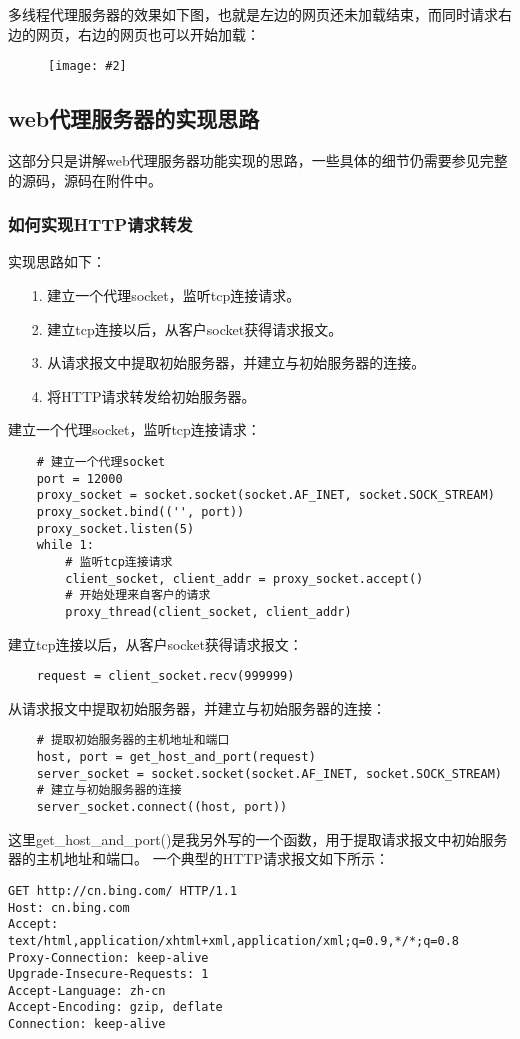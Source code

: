 \documentclass[a4paper,left=2.5cm,right=2.5cm,11pt]{article}
\newcommand{\sizedfic}[2]{\begin{figure}[H]
		\center
		\texttt{[image: \#2]}
	\end{figure}}
\begin{document}
	多线程代理服务器的效果如下图，也就是左边的网页还未加载结束，而同时请求右边的网页，右边的网页也可以开始加载：
	\sizedfic{0.7}{3.jpeg}

\subsection{web代理服务器的实现思路}
	这部分只是讲解web代理服务器功能实现的思路，一些具体的细节仍需要参见完整的源码，源码在附件中。

\subsubsection{如何实现HTTP请求转发}
	实现思路如下：
	\begin{itemize}
		\item[1.] 建立一个代理socket，监听tcp连接请求。
		\item[2.] 建立tcp连接以后，从客户socket获得请求报文。
		\item[3.] 从请求报文中提取初始服务器，并建立与初始服务器的连接。
		\item[4.] 将HTTP请求转发给初始服务器。
	\end{itemize}

	建立一个代理socket，监听tcp连接请求：
	\begin{lstlisting}
	# 建立一个代理socket
	port = 12000
	proxy_socket = socket.socket(socket.AF_INET, socket.SOCK_STREAM)
	proxy_socket.bind(('', port))
	proxy_socket.listen(5)
	while 1:
		# 监听tcp连接请求
		client_socket, client_addr = proxy_socket.accept()
		# 开始处理来自客户的请求
		proxy_thread(client_socket, client_addr)
	\end{lstlisting}

	建立tcp连接以后，从客户socket获得请求报文：
	\begin{lstlisting}
	request = client_socket.recv(999999)
	\end{lstlisting}

	从请求报文中提取初始服务器，并建立与初始服务器的连接：
	\begin{lstlisting}
	# 提取初始服务器的主机地址和端口
	host, port = get_host_and_port(request)
	server_socket = socket.socket(socket.AF_INET, socket.SOCK_STREAM)
	# 建立与初始服务器的连接
	server_socket.connect((host, port))
	\end{lstlisting}

	这里get\_host\_and\_port()是我另外写的一个函数，用于提取请求报文中初始服务器的主机地址和端口。
	一个典型的HTTP请求报文如下所示：
	\begin{lstlisting}
GET http://cn.bing.com/ HTTP/1.1
Host: cn.bing.com
Accept: text/html,application/xhtml+xml,application/xml;q=0.9,*/*;q=0.8
Proxy-Connection: keep-alive
Upgrade-Insecure-Requests: 1
Accept-Language: zh-cn
Accept-Encoding: gzip, deflate
Connection: keep-alive
	\end{lstlisting}
\end{document}
